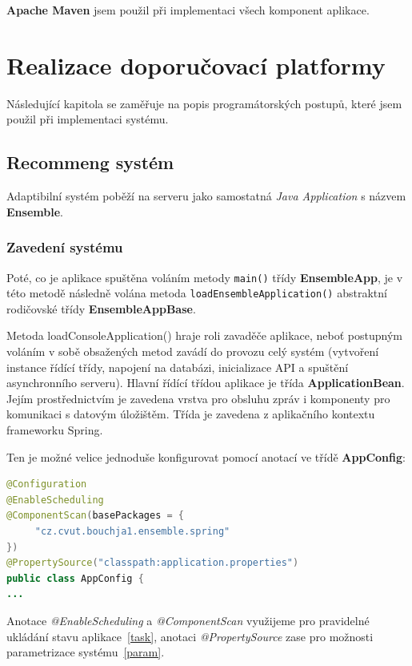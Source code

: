 \documentclass[thesis=M,czech]{FITthesis}[2014/05/07]
\begin{document}
\textbf{Apache Maven} jsem použil při implementaci všech komponent aplikace.

\section{Realizace doporučovací platformy}
\label{chap:impl}

Následující kapitola se zaměřuje na popis programátorských postupů, které jsem použil při implementaci systému.

\subsection{Recommeng systém}
\label{sec:impl}

Adaptibilní systém poběží na serveru jako samostatná \emph{Java Application} s názvem \textbf{Ensemble}.

\subsubsection{Zavedení systému}
Poté, co je aplikace spuštěna voláním metody \texttt{main()} třídy \textbf{EnsembleApp}, je v této metodě následně volána metoda \texttt{loadEnsembleApplication()} abstraktní rodičovské třídy \textbf{EnsembleAppBase}.

Metoda loadConsoleApplication() hraje roli zavaděče aplikace, neboť postupným voláním v sobě obsažených metod zavádí do provozu celý systém (vytvoření instance řídící třídy, napojení na databázi, inicializace API a spuštění asynchronního serveru). Hlavní řídící třídou aplikace je třída \textbf{ApplicationBean}. Jejím prostřednictvím je zavedena vrstva pro obsluhu zpráv i komponenty pro komunikaci s datovým úložištěm. Třída je zavedena z aplikačního kontextu frameworku Spring.

Ten je možné velice jednoduše konfigurovat pomocí anotací ve třídě \textbf{AppConfig}:

\begin{lstlisting}[language=java]
@Configuration
@EnableScheduling
@ComponentScan(basePackages = {
     "cz.cvut.bouchja1.ensemble.spring"
})
@PropertySource("classpath:application.properties")
public class AppConfig {
...
\end{lstlisting}

Anotace \emph{@EnableScheduling} a \emph{@ComponentScan} využijeme pro pravidelné ukládání stavu aplikace~\ref{task}, anotaci \emph{@PropertySource} zase pro možnosti parametrizace systému~\ref{param}.
\end{document}
